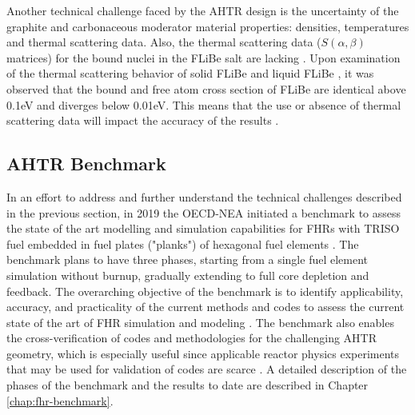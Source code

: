 Another technical challenge faced by the \gls{AHTR} design is the uncertainty of 
the graphite and carbonaceous moderator material properties: densities, temperatures
and thermal scattering data.
Also, the thermal scattering data ($S(\alpha,\beta)$ matrices) for the bound 
nuclei in the \gls{FLiBe} salt are lacking \cite{ramey_monte_2018}. 
Upon examination of the thermal scattering behavior of solid \gls{FLiBe}
\cite{mei_investigation_2013} and liquid \gls{FLiBe} \cite{zhu_thermal_2017}, 
it was observed that the bound and free atom cross section of \gls{FLiBe} are 
identical above 0.1eV and diverges below 0.01eV. 
This means that the use or absence of thermal scattering data will impact the 
accuracy of the results \cite{ramey_monte_2018}. 

\subsection{AHTR Benchmark}
In an effort to address and further understand the technical challenges described 
in the previous section, in 2019 the OECD-NEA initiated a benchmark to assess the 
state of the art modelling and simulation capabilities for \glspl{FHR} with 
\gls{TRISO} fuel embedded in fuel plates ("planks") of hexagonal fuel elements
\cite{noauthor_fluoride_nodate}. 
The benchmark plans to have three phases, starting from a single fuel element 
simulation without burnup, gradually extending to full core depletion and feedback. 
The overarching objective of the benchmark is to identify applicability, accuracy, 
and practicality of the current methods and codes to assess the current state 
of the art of \gls{FHR} simulation and modeling \cite{petrovic_preliminary_2021}. 
The benchmark also enables the cross-verification of codes and methodologies for the 
challenging \gls{AHTR} geometry, which is especially useful since applicable reactor 
physics experiments that may be used for validation of codes are scarce  
 \cite{petrovic_fhrahtr_2019,petrovic_preliminary_2021}. 
A detailed description of the phases of the benchmark and the results to date 
are described in Chapter \ref{chap:fhr-benchmark}. 

